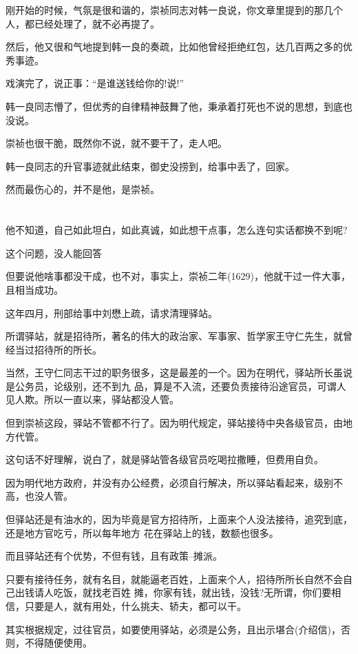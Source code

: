 \documentclass[11pt,a4paper,onecolumn]{article}
\begin{document}
刚开始的时候，气氛是很和谐的，崇祯同志对韩一良说，你文章里提到的那几个人，都已经处理了，就不必再提了。

然后，他又很和气地提到韩一良的奏疏，比如他曾经拒绝红包，达几百两之多的优秀事迹。

戏演完了，说正事：``是谁送钱给你的!说!''

韩一良同志懵了，但优秀的自律精神鼓舞了他，秉承着打死也不说的思想，到底也没说。

崇祯也很干脆，既然你不说，就不要干了，走人吧。

韩一良同志的升官事迹就此结束，御史没捞到，给事中丢了，回家。

然而最伤心的，并不是他，是崇祯。

\section[\thesection]{}

他不知道，自己如此坦白，如此真诚，如此想干点事，怎么连句实话都换不到呢?

这个问题，没人能回答

但要说他啥事都没干成，也不对，事实上，崇祯二年(1629)，他就干过一件大事，且相当成功。

这年四月，刑部给事中刘懋上疏，请求清理驿站。

所谓驿站，就是招待所，著名的伟大的政治家、军事家、哲学家王守仁先生，就曾经当过招待所的所长。

当然，王守仁同志干过的职务很多，这是最差的一个。因为在明代，驿站所长虽说是公务员，论级别，还不到九
品，算是不入流，还要负责接待沿途官员，可谓人见人欺。所以一直以来，驿站都没人管。

但到崇祯这段，驿站不管都不行了。因为明代规定，驿站接待中央各级官员，由地方代管。

这句话不好理解，说白了，就是驿站管各级官员吃喝拉撒睡，但费用自负。

因为明代地方政府，并没有办公经费，必须自行解决，所以驿站看起来，级别不高，也没人管。

但驿站还是有油水的，因为毕竟是官方招待所，上面来个人没法接待，追究到底，还是地方官吃亏，所以每年地方
花在驿站上的钱，数额也很多。

而且驿站还有个优势，不但有钱，且有政策--摊派。

只要有接待任务，就有名目，就能逼老百姓，上面来个人，招待所所长自然不会自己出钱请人吃饭，就找老百姓
摊，你家有钱，就出钱，没钱?无所谓，你们要相信，只要是人，就有用处，什么挑夫、轿夫，都可以干。

其实根据规定，过往官员，如要使用驿站，必须是公务，且出示堪合(介绍信)，否则，不得随便使用。
\end{document}

